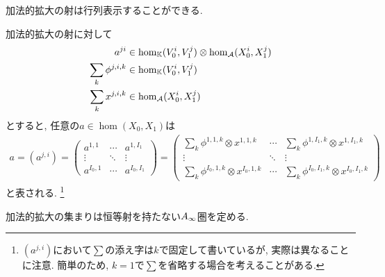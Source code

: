 \documentclass[uplatex, a4paper, 14Q, dvipdfmx]{jsarticle}
\begin{document}
加法的拡大の射は行列表示することができる.

\begin{notation}[加法的拡大の射の行列表示]
  加法的拡大の射に対して
  \begin{align*}
    a^{ji} &\in \hom_{\mathbb{K}}(V_0^i,V_1^j) \otimes \hom_{\mathcal{A}}(X_0^i,X_1^j) \\
    \sum_{k} \phi^{j,i,k} &\in \hom_{\mathbb{K}}(V_0^i,V_1^j) \\
    \sum_{k} x^{j,i,k} &\in \hom_{\mathcal{A}}(X_0^i,X_1^j)
  \end{align*}
  とすると, 任意の$a \in \hom (X_0,X_1)$は
  \begin{align*}
    a = (a^{j,i}) 
    = \begin{pmatrix}
      a^{1,1} & \cdots & a^{1,I_1} \\
      \vdots & \ddots & \vdots \\
      a^{I_0,1} & \cdots & a^{I_0,I_1}
    \end{pmatrix}
    = \begin{pmatrix}
      \sum_{k} \phi^{1,1,k} \otimes x^{1,1,k} & \cdots & \sum_{k} \phi^{1,I_1,k} \otimes x^{1,I_1,k} \\
      \vdots & \ddots & \vdots \\
      \sum_{k} \phi^{I_0,1,k} \otimes x^{I_0,1,k} & \cdots & \sum_{k} \phi^{I_0,I_1,k} \otimes x^{I_0,I_1,k}
    \end{pmatrix}
  \end{align*}
  と表される. 
  \footnote{
    $(a^{j,i})$において$\sum$の添え字は$k$で固定して書いているが, 実際は異なることに注意.
    簡単のため, $k=1$で$\sum$を省略する場合を考えることがある. 
  }
\end{notation}

加法的拡大の集まりは恒等射を持たない$A_{\infty}$圏を定める.
\end{document}
